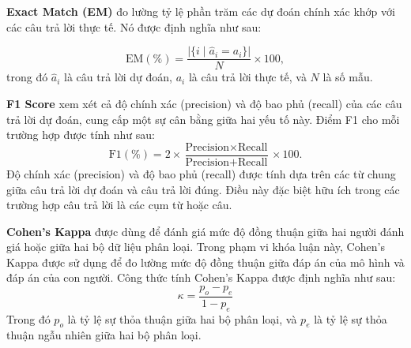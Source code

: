 \textbf{Exact Match (EM)} đo lường tỷ lệ phần trăm các dự đoán chính xác khớp với các câu trả lời thực tế. Nó được định nghĩa như sau:


\begin{equation*}
    \text{EM} (\%) = \frac{\lvert \{i \mid \hat{a}_i = a_i \} \rvert}{N} \times 100,
\end{equation*}
trong đó $\hat{a}_i$ là câu trả lời dự đoán, $a_i$ là câu trả lời thực tế, và $N$ là số mẫu.


\textbf{F1 Score} xem xét cả độ chính xác (precision) và độ bao phủ (recall) của các câu trả lời dự đoán, cung cấp một sự cân bằng giữa hai yếu tố này. Điểm F1 cho mỗi trường hợp được tính như sau:
\begin{equation*}
    \text{F1} (\%) = 2 \times \frac{\text{Precision} \times \text{Recall}}{\text{Precision} + \text{Recall}} \times 100.
\end{equation*}
Độ chính xác (precision) và độ bao phủ (recall) được tính dựa trên các từ chung giữa câu trả lời dự đoán và câu trả lời đúng. Điều này đặc biệt hữu ích trong các trường hợp câu trả lời là các cụm từ hoặc câu.


\textbf{Cohen's Kappa} được dùng để đánh giá mức độ đồng thuận giữa hai người đánh giá hoặc giữa hai bộ dữ liệu phân loại. Trong phạm vi khóa luận này, Cohen's Kappa được sử dụng để đo lường mức độ đồng thuận giữa đáp án của mô hình và đáp án của con người. Công thức tính Cohen's Kappa được định nghĩa như sau:
\begin{equation*}
    \kappa = \frac{p_o - p_e}{1 - p_e}
\end{equation*}
Trong đó $p_o$ là tỷ lệ sự thỏa thuận giữa hai bộ phân loại, và $p_e$ là tỷ lệ sự thỏa thuận ngẫu nhiên giữa hai bộ phân loại.


